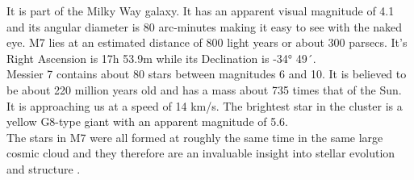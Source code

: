\documentclass[12pt]{article}
\begin{document}
		It is part of the Milky Way galaxy. It has an apparent visual magnitude of 4.1 and its angular diameter is 80 arc-minutes making it easy to see with the naked eye. M7 lies at an estimated distance of 800 light years or about 300 parsecs. It's Right Ascension is 17h 53.9m while its Declination is -34° 49´\cite{astropixels_m7}.\\
		Messier 7 contains about 80 stars between magnitudes 6 and 10. It is believed to be about 220 million years old and has a mass about 735 times that of the Sun. It is approaching us at a speed of 14 km/s. The brightest star in the cluster is a yellow G8-type giant with an apparent magnitude of 5.6.\\
		The stars in M7 were all formed at roughly the same time in the same large cosmic cloud and they therefore are an invaluable insight into stellar evolution and structure \cite{messier007}.\\
\end{document}
